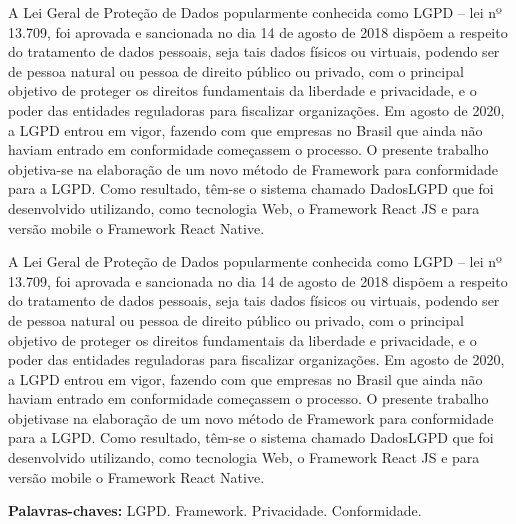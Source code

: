 \documentclass[
	12pt,				%
	openright,			%
	oneside,			%
	a4paper,			%
	english,			%
	french,				%
	spanish,			%
	brazil,				%
	]{abntex2}
\begin{document}
\begin{agradecimentos}

A Lei Geral de Proteção de Dados popularmente conhecida como LGPD – lei nº 13.709, foi aprovada e sancionada no dia 14 de agosto de 2018 dispõem a respeito do tratamento de dados pessoais, seja tais dados físicos ou virtuais, podendo ser de pessoa natural ou pessoa de direito público ou privado, com o principal objetivo de proteger os direitos fundamentais da liberdade e privacidade, e o poder das entidades reguladoras para fiscalizar organizações. Em agosto de 2020, a LGPD entrou em vigor, fazendo com que empresas no Brasil que ainda não haviam entrado em conformidade começassem o processo. O presente trabalho objetiva-se na elaboração de um novo método de Framework para conformidade para a LGPD. Como resultado, têm-se o sistema chamado DadosLGPD que foi desenvolvido utilizando, como tecnologia Web, o Framework React JS e para versão mobile o Framework React Native.

\end{agradecimentos}



\begin{resumo}
\noindent
A Lei Geral de Proteção de Dados popularmente conhecida como LGPD – lei nº 13.709, foi aprovada e sancionada no dia 14 de agosto de 2018 dispõem a respeito
do tratamento de dados pessoais, seja tais dados físicos ou virtuais, podendo ser
de pessoa natural ou pessoa de direito público ou privado, com o principal objetivo
de proteger os direitos fundamentais da liberdade e privacidade, e o poder das
entidades reguladoras para fiscalizar organizações. Em agosto de 2020, a LGPD
entrou em vigor, fazendo com que empresas no Brasil que ainda não haviam
entrado em conformidade começassem o processo. O presente trabalho objetivase na elaboração de um novo método de Framework para conformidade para a
LGPD. Como resultado, têm-se o sistema chamado DadosLGPD que foi
desenvolvido utilizando, como tecnologia Web, o Framework React JS e para versão mobile o Framework React Native.


 \vspace{\onelineskip}
    
 \noindent
 \textbf{Palavras-chaves:} LGPD. Framework. Privacidade. Conformidade.
\end{resumo}
\end{document}
